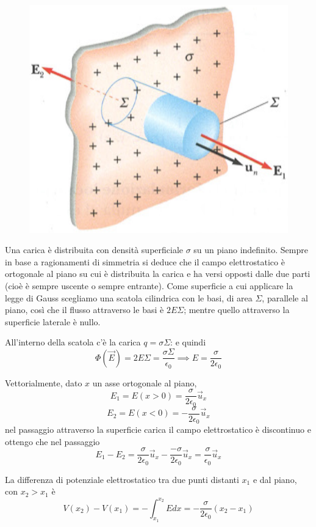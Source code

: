 \documentclass[class=book, crop=false, oneside, 12pt]{standalone}
\begin{document}
\begin{figure}[h]
    \includegraphics[scale=0.4]{campo_piano_indefinito.png}
    \centering
    \caption{}
\end{figure}

Una carica è distribuita con densità superficiale \(\sigma\) su un piano indefinito.  
Sempre in base a ragionamenti di simmetria si deduce che il campo elettrostatico è ortogonale al piano su cui è distribuita la carica e ha versi opposti dalle due parti (cioè è sempre uscente o sempre entrante).
Come superficie a cui applicare la legge di Gauss scegliamo una scatola cilindrica con le basi, di area \(\Sigma\), parallele al piano, così che il flusso attraverso le basi è \(2 E \Sigma\); mentre quello attraverso la superficie laterale è nullo.

All'interno della scatola c'è la carica \(q = \sigma \Sigma\): e quindi
\begin{equation*}
    \Phi(\overrightarrow{E}) = 2 E \Sigma = \frac{\sigma \Sigma}{\epsilon_0} \implies E = \frac{\sigma}{2 \epsilon_0}
\end{equation*}

Vettorialmente, dato \(x\) un asse ortogonale al piano,
\begin{equation*}
    E_1 = E(x > 0 ) = \frac{\sigma}{2 \epsilon_0} \overrightarrow{u}_x
\end{equation*}
\begin{equation*}
    E_2 = E(x < 0 ) = - \frac{\sigma}{2 \epsilon_0} \overrightarrow{u}_x
\end{equation*}
nel passaggio attraverso la superficie carica il campo elettrostatico è discontinuo e ottengo che nel passaggio
\begin{equation*}
    E_1 - E_2 = \frac{\sigma}{2 \epsilon_0} \overrightarrow{u}_x - \frac{- \sigma}{2 \epsilon_0} \overrightarrow{u}_x = \frac{\sigma}{\epsilon_0} \overrightarrow{u}_x
\end{equation*}

La differenza di potenziale elettrostatico tra due punti distanti \(x_1\) e dal piano, con \(x_2 > x_1\) è 
\begin{equation*}
    V(x_2) - V(x_1) = - \int_{x_1}^{x_2} E dx = - \frac{\sigma}{2 \epsilon_0} (x_2 - x_1)
\end{equation*}
\end{document}
